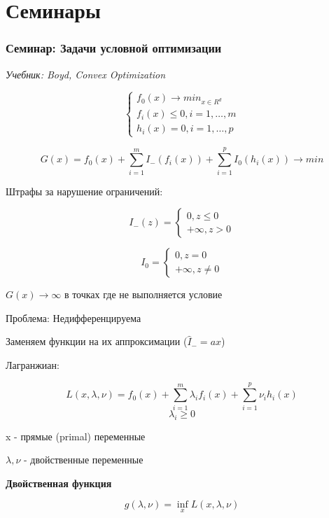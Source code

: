 \documentclass[a4paper, 12pt]{article}
\begin{document}
\pagebreak

\part{Семинары}
\section{Семинар: Задачи условной оптимизации}

\textit{Учебник: Boyd, Convex Optimization}

\[\begin{cases}
    f_0(x) \rightarrow min_{x \in R^d} \\
    f_i(x) \leq 0, i = 1, \ldots, m \\
    h_i(x) = 0, i = 1, \ldots, p
\end{cases}\]

\[G(x) = f_0(x) + \sum_{i = 1}^m I_{-}(f_i(x)) + \sum_{i = 1}^p I_0(h_i(x)) \rightarrow min\]

Штрафы за нарушение ограничений:

\[I_{-}(z) = \begin{cases}
    0, z \leq 0 \\
    + \infty, z > 0 
\end{cases}\]

\[I_{0} = \begin{cases}
    0, z = 0 \\
    + \infty, z \neq 0 
\end{cases}\]

\(G(x) \rightarrow \infty\) в точках где не выполняется условие

Проблема: Недифференцируема

Заменяем функции на их аппроксимации ($\hat{I}_{-} = ax$)

Лагранжиан:

\[L(x, \lambda, \nu) = f_0(x) + \sum_{i = 1}^m \lambda_i f_i(x) + \sum_{i = 1}^p \nu_i h_i(x)\]
\[\lambda_i \geq 0\]

x - прямые (primal) переменные

$\lambda, \nu$ - двойственные переменные

\textbf{Двойственная функция}

\[g(\lambda, \nu) = \inf_{x} L(x, \lambda, \nu)\]
\end{document}
